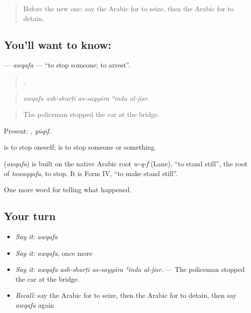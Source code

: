 \label{lesson:AR-C317-awqafa}



\begin{quote}
Before the new one: say the Arabic for to seize, then the Arabic for to detain.
\end{quote}

\subsection*{You'll want to know: }
\textbf{} — \emph{awqafa} — \textquotedblleft{}to stop someone; to arrest\textquotedblright{}.

\begin{quote}
    .
\end{quote}

\begin{quote}
\emph{awqafa ash-shurṭī as-sayyāra ʿinda al-jisr.}
\end{quote}

\begin{quote}
The policeman stopped the car at the bridge.
\end{quote}

Present: , \emph{yūqif}.

 is to stop oneself;  is to stop someone or something.

\begin{cousinweb}
\textbf{} (\emph{awqafa}) is built on the native Arabic root \emph{w-q-f} (Lane), \textquotedblleft{}to stand still\textquotedblright{}, the root of \emph{tawaqqafa}, to stop. It is Form IV, \textquotedblleft{}to make stand still\textquotedblright{}.
\end{cousinweb}

\begin{grammarlens}[title={What you've built}]
One more word for telling what happened.
\end{grammarlens}

\subsection*{Your turn}
\begin{itemize}
\raggedright
  \item \emph{Say it:} \emph{awqafa}
  \item \emph{Say it:} \emph{awqafa}, once more
  \item \emph{Say it:} \emph{awqafa ash-shurṭī as-sayyāra ʿinda al-jisr.} — The policeman stopped the car at the bridge.
  \item \emph{Recall:} say the Arabic for to seize, then the Arabic for to detain, then say \emph{awqafa} again
\end{itemize}

